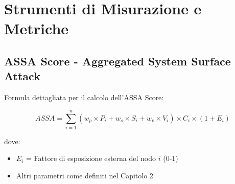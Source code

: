 \chapter{Strumenti di Misurazione e Metriche}

\section{ASSA Score - Aggregated System Surface Attack}

Formula dettagliata per il calcolo dell'ASSA Score:

\begin{equation}
ASSA = \sum_{i=1}^{n} \left(w_p \times P_i + w_s \times S_i + w_v \times V_i\right) \times C_i \times (1 + E_i)
\end{equation}

dove:
\begin{itemize}
\item $E_i$ = Fattore di esposizione esterna del nodo $i$ (0-1)
\item Altri parametri come definiti nel Capitolo 2
\end{itemize}